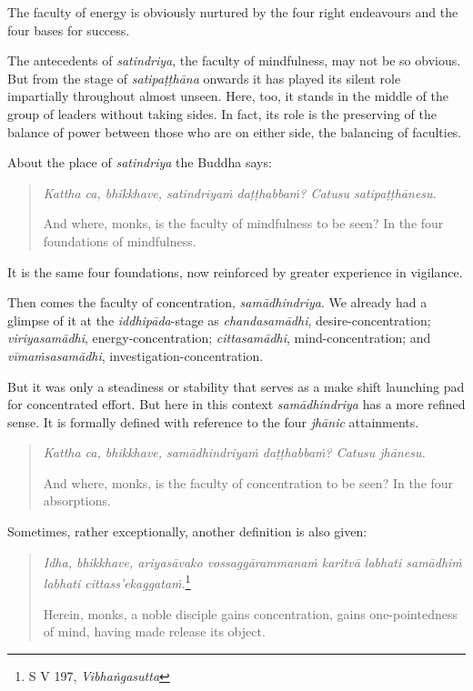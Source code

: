 The faculty of energy is obviously nurtured by the four right endeavours and the four bases for success.

The antecedents of \emph{satindriya}, the faculty of mindfulness, may not be so obvious. But from the stage of \emph{satipaṭṭhāna} onwards it has played its silent role impartially throughout almost unseen. Here, too, it stands in the middle of the group of leaders without taking sides. In fact, its role is the preserving of the balance of power between those who are on either side, the balancing of faculties.

About the place of \emph{satindriya} the Buddha says:

\begin{quote}
\emph{Kattha ca, bhikkhave, satindriyaṁ daṭṭhabbaṁ? Catusu satipaṭṭhānesu.}

And where, monks, is the faculty of mindfulness to be seen? In the four foundations of mindfulness.
\end{quote}

It is the same four foundations, now reinforced by greater experience in vigilance.

Then comes the faculty of concentration, \emph{samādhindriya}. We already had a glimpse of it at the \emph{iddhipāda}-stage as \emph{chandasamādhi}, desire-concentration; \emph{viriyasamādhi}, energy-concentration; \emph{cittasamādhi}, mind-concentration; and \emph{vīmaṁsasamādhi}, investigation-concentration.

But it was only a steadiness or stability that serves as a make shift launching pad for concentrated effort. But here in this context \emph{samādhindriya} has a more refined sense. It is formally defined with reference to the four \emph{jhānic} attainments.

\begin{quote}
\emph{Kattha ca, bhikkhave, samādhindriyaṁ daṭṭhabbaṁ? Catusu jhānesu.}

And where, monks, is the faculty of concentration to be seen? In the four absorptions.
\end{quote}

Sometimes, rather exceptionally, another definition is also given:

\begin{quote}
\emph{Idha, bhikkhave, ariyasāvako vossaggārammanaṁ karitvā labhati samādhiṁ labhati cittass'ekaggataṁ.}\footnote{S V 197, \emph{Vibhaṅgasutta}}

Herein, monks, a noble disciple gains concentration, gains one-pointedness of mind, having made release its object.
\end{quote}

